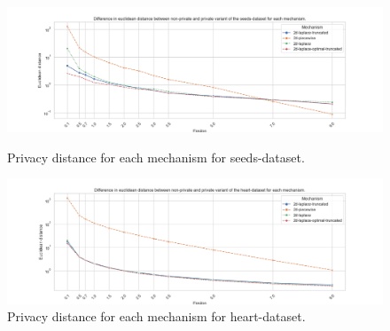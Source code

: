 
\newpage



\begin{figure}[H]
    \centering
    \begin{minipage}[c]{0.90\textwidth}
        \includegraphics[width=1\textwidth]{Results/RQ1/seeds-dataset/privacy_distance_plot.png}
        \caption{Privacy distance for each mechanism for seeds-dataset.}
        \label{fig:privacy_seeds-dataset_comparison_2d_privacy_distance_plot}
    \end{minipage}
    \begin{minipage}[c]{0.90\textwidth}
        \includegraphics[width=1\textwidth]{Results/RQ1/heart-dataset/privacy_distance_plot.png}
        \caption{Privacy distance for each mechanism for heart-dataset.}
        \label{fig:privacy_heart-dataset_comparison_2d_privacy_distance_plot}
    \end{minipage}
\end{figure}

\newpage
